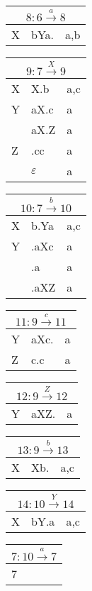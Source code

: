 \documentclass[11pt]{scrartcl}
\begin{document}
	\begin{table}[h]
			\begin{tabular}[t]{l|l|l}
				\multicolumn{3}{c}{$8: 6 \xrightarrow{a} 8$} \\ \hline
				X & bYa. & a,b \\ 
			\end{tabular}
			\begin{tabular}[t]{l|l|l}
				\multicolumn{3}{c}{$9: 7 \xrightarrow{X} 9$} \\ \hline
				X & X.b & a,c \\ \hline
				Y & aX.c & a \\ 
				 & aX.Z & a \\ \hline
				Z & .cc & a \\
				& $\varepsilon$ & a 
			\end{tabular}
			\begin{tabular}[t]{l|l|l}
				\multicolumn{3}{c}{$10: 7 \xrightarrow{b} 10$} \\ \hline
				X & b.Ya & a,c \\ \hline
				Y & .aXc & a \\ 
				& .a & a \\ 
				 & .aXZ & a \\
			\end{tabular}
		\end{table}
		
	\begin{table}[h]
		\begin{tabular}[t]{l|l|l}
				\multicolumn{3}{c}{$11: 9 \xrightarrow{c} 11$} \\ \hline
				Y & aXc. & a \\ \hline
				Z & c.c & a
		\end{tabular}
		\begin{tabular}[t]{l|l|l}
			\multicolumn{3}{c}{$12: 9 \xrightarrow{Z} 12$} \\ \hline
			Y & aXZ. & a \\
		\end{tabular}
		\begin{tabular}[t]{l|l|l}
			\multicolumn{3}{c}{$13: 9 \xrightarrow{b} 13$} \\ \hline
			X & Xb. & a,c \\
		\end{tabular}
		\begin{tabular}[t]{l|l|l}
				\multicolumn{3}{c}{$14: 10 \xrightarrow{Y} 14$} \\ \hline
			X & bY.a & a,c \\
		\end{tabular}
		\begin{tabular}[t]{l}
				$7: 10 \xrightarrow{a} 7$ \\ \hline
				7\\
		\end{tabular}
	\end{table}
		
\end{document}
